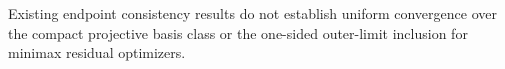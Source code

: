 Existing endpoint consistency results do not establish uniform convergence over the compact projective basis class or the one-sided outer-limit inclusion for minimax residual optimizers.